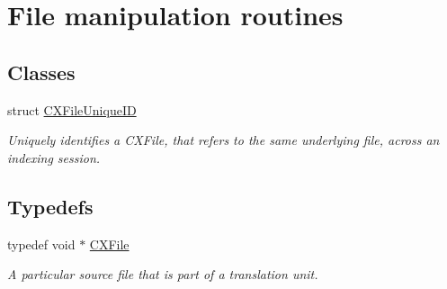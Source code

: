 \hypertarget{group__CINDEX__FILES}{}\section{File manipulation routines}
\label{group__CINDEX__FILES}
\subsection*{Classes}
\begin{DoxyCompactItemize}
\item 
struct \mbox{\hyperlink{structCXFileUniqueID}{C\+X\+File\+Unique\+ID}}
\begin{DoxyCompactList}\small\item\em Uniquely identifies a C\+X\+File, that refers to the same underlying file, across an indexing session. \end{DoxyCompactList}\end{DoxyCompactItemize}
\subsection*{Typedefs}
\begin{DoxyCompactItemize}
\item 
\mbox{\label{group__CINDEX__FILES_gacfcea9c1239c916597e2e5b3e109215a}} 
typedef void $\ast$ \mbox{\hyperlink{group__CINDEX__FILES_gacfcea9c1239c916597e2e5b3e109215a}{C\+X\+File}}
\begin{DoxyCompactList}\small\item\em A particular source file that is part of a translation unit. \end{DoxyCompactList}\end{DoxyCompactItemize}
